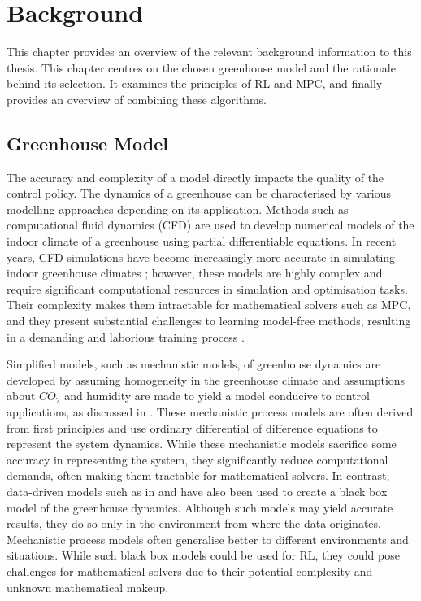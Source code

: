 \chapter{Background}
\label{chapter:Background}

This chapter provides an overview of the relevant background information to this thesis. This chapter centres on the chosen greenhouse model and the rationale behind its selection. It examines the principles of RL and MPC, and finally provides an overview of combining these algorithms. 

\section{Greenhouse Model}
\label{section:greenhouse-model}

The accuracy and complexity of a model directly impacts the quality of the control policy.  The dynamics of a greenhouse can be characterised by various modelling approaches depending on its application. Methods such as computational fluid dynamics (CFD) are used to develop numerical models of the indoor climate of a greenhouse using partial differentiable equations. In recent years, CFD simulations have become increasingly more accurate in simulating indoor greenhouse climates \cite{delatorre-geaComputationalFluidDynamics2011}; however, these models are highly complex and require significant computational resources in simulation and optimisation tasks.
Their complexity makes them intractable for mathematical solvers such as MPC, and they present substantial challenges to learning model-free methods, resulting in a demanding and laborious training process \cite{jansenOptimalControlLettuce2023}. 

Simplified models, such as mechanistic models, of greenhouse dynamics are developed by assuming homogeneity in the greenhouse climate and assumptions about $CO_2$ and humidity are made to yield a model conducive to  control applications, as discussed in \citet{jansenOptimalControlLettuce2023, lopez-cruzDevelopmentAnalysisDynamical2018}. These mechanistic process models are often derived from first principles and use ordinary differential of difference equations to represent the system dynamics. While these mechanistic models sacrifice some accuracy in representing the system, they significantly reduce computational demands, often making them tractable for mathematical solvers. 
In contrast, data-driven models such as in \citet{gongDeepLearningBased2021} and \citet{maestriniMixingProcessbasedDatadriven2022} have also been used to create a black box model of the greenhouse dynamics. Although such models may yield accurate results, they do so only in the environment from where the data originates. Mechanistic process models often generalise better to different environments and situations. While such black box models could be used for RL, they could pose challenges for mathematical solvers due to their potential complexity and unknown mathematical makeup.

